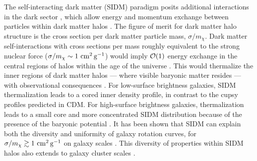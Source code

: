 The self-interacting dark matter (SIDM) paradigm posits additional interactions in the dark sector \citep[\eg,][]{1992ApJ...398...43C,Spergel:1999mh,Dave:2000ar,Firmani:2000ce}, which allow energy and momentum exchange between particles within dark matter halos \citep[see][for a recent review]{Tulin:2017ara}. The figure of merit for dark matter halo structure is the cross section per dark matter particle mass, $\sigma/m_\chi$.
Dark matter self-interactions with cross sections per mass roughly equivalent to the strong nuclear force ($\sigma/m_\chi \sim 1 \mathrm{\,\mathrm{\,cm}^2\mathrm{\,g}^{-1}}$) would imply ${\cal O}(1)$ energy exchange in the central regions of halos within the age of the universe \citep{2012MNRAS.423.3740V,2013MNRAS.431L..20Z,2013MNRAS.430..105P,Rocha:2012jg}. This  would thermalize the inner regions of dark matter halos --- where visible baryonic matter resides --- with observational consequences \citep[\eg][]{Kaplinghat:2013xca}. For low-surface brightness galaxies, SIDM thermalization leads to a cored inner density profile, in contrast to the cupsy profiles predicted in CDM. For high-surface brightness galaxies, thermalization leads to a small core and more concentrated SIDM distribution because of the presence of the baryonic potential \citep{Kaplinghat:2015aga}. It has been shown that SIDM can explain both the diversity and uniformity of galaxy rotation curves, for $\sigma/m_\chi \gtrsim 1\mathrm{\,\mathrm{\,cm}^2\mathrm{\,g}^{-1}}$ on galaxy scales \citep{Kamada:2016euw,Creasey:2016jaq,Ren:2018jpt}. This diversity of properties within SIDM halos also extends to galaxy cluster scales \citep{Robertson:2017mgj}.

